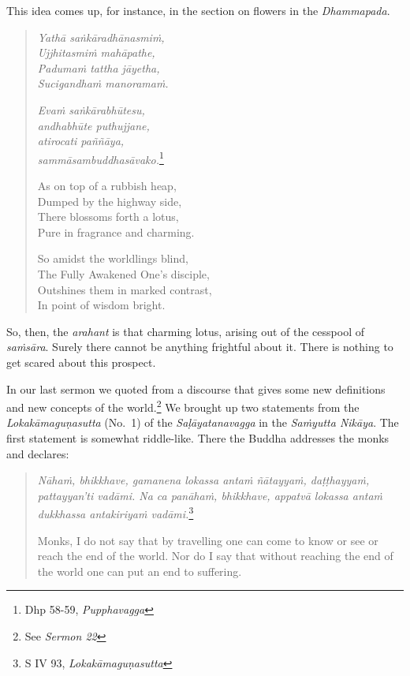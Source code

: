 This idea comes up, for instance, in the section on flowers in the \emph{Dhammapada}.

\clearpage

\begin{quote}
\emph{Yathā saṅkāradhānasmiṁ,}\\
\emph{Ujjhitasmiṁ mahāpathe,}\\
\emph{Padumaṁ tattha jāyetha,}\\
\emph{Sucigandhaṁ manoramaṁ.}

\emph{Evaṁ saṅkārabhūtesu,}\\
\emph{andhabhūte puthujjane,}\\
\emph{atirocati paññāya,}\\
\emph{sammāsambuddhasāvako.}\footnote{Dhp 58-59, \emph{Pupphavagga}}

As on top of a rubbish heap,\\
Dumped by the highway side,\\
There blossoms forth a lotus,\\
Pure in fragrance and charming.

So amidst the worldlings blind,\\
The Fully Awakened One's disciple,\\
Outshines them in marked contrast,\\
In point of wisdom bright.
\end{quote}

So, then, the \emph{arahant} is that charming lotus, arising out of the cesspool of \emph{saṁsāra}. Surely there cannot be anything frightful about it. There is nothing to get scared about this prospect.

In our last sermon we quoted from a discourse that gives some new definitions and new concepts of the world.\footnote{See \emph{Sermon 22}} We brought up two statements from the \emph{Lokakāmaguṇasutta} (No.~1) of the \emph{Saḷāyatanavagga} in the \emph{Saṁyutta Nikāya}. The first statement is somewhat riddle-like. There the Buddha addresses the monks and declares:

\begin{quote}
\emph{Nāhaṁ, bhikkhave, gamanena lokassa antaṁ ñātayyaṁ, daṭṭhayyaṁ, pattayyan'ti vadāmi. Na ca panāhaṁ, bhikkhave, appatvā lokassa antaṁ dukkhassa antakiriyaṁ vadāmi.}\footnote{S IV 93, \emph{Lokakāmaguṇasutta}}

Monks, I do not say that by travelling one can come to know or see or reach the end of the world. Nor do I say that without reaching the end of the world one can put an end to suffering.
\end{quote}

